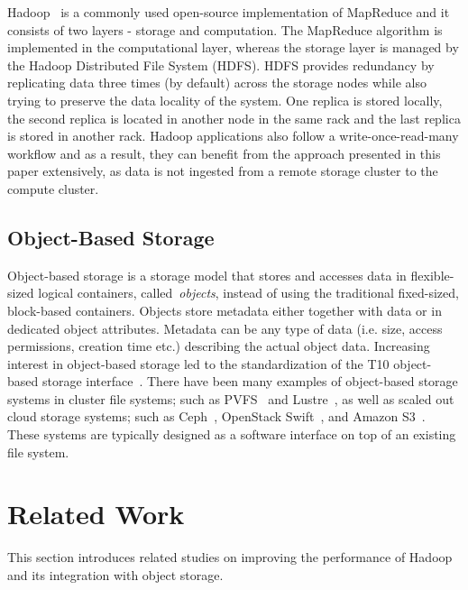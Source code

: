 \documentclass[preprint,12pt]{elsarticle}
\begin{document}
Hadoop~\cite{apache_hadoop} is a commonly used open-source implementation of MapReduce and it consists of
two layers - storage and computation. The MapReduce algorithm is implemented in the computational layer, whereas
the storage layer is managed by the Hadoop Distributed File System (HDFS). HDFS provides redundancy by replicating data
three times (by default) across the storage nodes while also trying to
preserve the data locality of the system. One
replica is stored locally, the second replica is located in another node in the same rack and the last replica is
stored in another rack. Hadoop applications also follow a write-once-read-many workflow and as a
result, they can benefit from the approach presented in this paper extensively, as data is not ingested
from a remote storage cluster to the compute cluster.

\subsection{Object-Based Storage}
Object-based storage is a storage model that stores and accesses data in flexible-sized logical
containers, called~\textit{objects}, instead of using the traditional fixed-sized, block-based
containers. Objects store metadata either together with data or in dedicated object attributes. Metadata can
be any type of data (i.e. size, access permissions, creation time etc.) describing the actual object data.
Increasing interest in object-based storage led to the standardization of the T10 object-based storage interface~\cite{osd3}.
There have been many examples of object-based storage systems in cluster file systems; such as PVFS~\cite{Carns:2000:PPF:1268379.1268407}
and Lustre~\cite{lustre_web}, as well as scaled out cloud storage systems; such as Ceph~\cite{cephorig},
OpenStack Swift~\cite{openstack_swift}, and Amazon S3~\cite{amazon_s3}. These systems are typically
designed as a software interface on top of an existing file system.

\section{Related Work}
\label{sec-related}
\label{relatedwork}
This section introduces related studies on improving the performance of Hadoop and its integration with object
storage.
\end{document}
